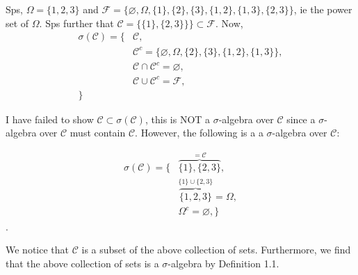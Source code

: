 \documentclass[letterpaper,12pt,titlepage,oneside,final]{book}
\begin{document}




Sps, $\Omega = \{1,2,3\}$ and $\mathcal{F} = \{\varnothing, \Omega, \{1\}, \{2\}, \{3\}, \{1,2\}, \{1,3\}, \{2,3\}\}$, ie the power set of $\Omega$. Sps further that $\mathcal{C} = \{\{1\}, \{2,3\}\}\} \subset \mathcal{F}$.
Now, 
\begin{align*}
\sigma(\mathcal{C}) = \{&\mathcal{C}, \\
						&\mathcal{C}^{c} =\{ \varnothing, \Omega, \{2\}, \{3\}, \{1,2\}, \{1,3\}  \}, \\
						&\mathcal{C} \cap \mathcal{C}^{c} = \varnothing, \\
						&\mathcal{C} \cup \mathcal{C}^{c} = \mathcal{F}, \\
						 \}
\end{align*}

I have failed to show $\mathcal{C} \subset \sigma(\mathcal{C}) $, this is NOT a  $\sigma$-algebra over $\mathcal{C} $ since a $\sigma$-algebra over $\mathcal{C} $ must contain $\mathcal{C}$. However, the following is a a $\sigma$-algebra over $\mathcal{C}$:


\begin{align*}
\sigma(\mathcal{C}) = \{&\overbrace{\{1\}, \{2,3\}}^{ = \mathcal{C} }, \\
						&\overbrace{\{1, 2,3\}}^{{\{1\} \cup \{2,3\}}  } = \Omega, \\
						& \Omega^{c} = \varnothing, \}
\end{align*}.

We notice that  $\mathcal{C}$ is a subset of the above collection of sets. Furthermore, we find that the above collection of sets is a $\sigma$-algebra by Definition 1.1.
\end{document}
